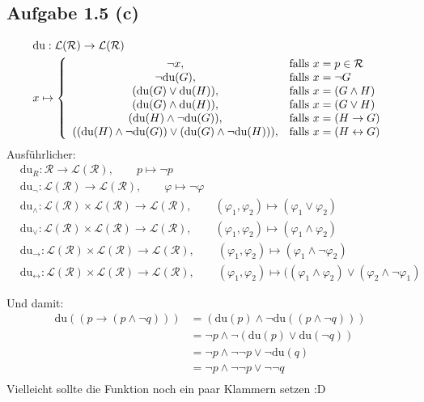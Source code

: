 \subsection*{Aufgabe 1.5 (c)}
\begin{align*}
	&\text{du}:\mathcal{L}(\mathcal{R})\to\mathcal{L}(\mathcal{R})\\
	&x\mapsto \left\lbrace\begin{array}{cl}
		\neg x, & \text{falls } x=p\in\mathcal{R}\\
		\neg\text{du}(G), & \text{falls } x=\neg G\\
		(\text{du}(G)\vee\text{du}(H)), & \text{falls } x=(G\wedge H)\\
		(\text{du}(G)\wedge\text{du}(H)), & \text{falls } x=(G\vee H)\\
		(\text{du}(H)\wedge\neg\text{du}(G)), & \text{falls } x=(H\to G)\\
		((\text{du}(H)\wedge\neg \text{du}(G))\vee(\text{du}(G)\wedge\neg\text{du}(H))), & \text{falls } x=(H\leftrightarrow G)\\
	\end{array}\right.
\end{align*}
Ausführlicher:
\begin{align*}
	&\text{du}_R:\mathcal{R}\to\mathcal{L}(\mathcal{R}),\qquad p\mapsto\neg p\\
	&\text{du}_{\neg}:\mathcal{L}(\mathcal{R})\to\mathcal{L}(\mathcal{R}),\qquad\varphi\mapsto\neg\varphi\\
	&\text{du}_{\wedge}:\mathcal{L}(\mathcal{R})\times\mathcal{L}(\mathcal{R})\to\mathcal{L}(\mathcal{R}),\qquad(\varphi_1,\varphi_2)\mapsto(\varphi_1\vee\varphi_2)\\
	&\text{du}_{\vee}:\mathcal{L}(\mathcal{R})\times\mathcal{L}(\mathcal{R})\to\mathcal{L}(\mathcal{R}),\qquad(\varphi_1,\varphi_2)\mapsto(\varphi_1\wedge\varphi_2)\\
	&\text{du}_{\to}:\mathcal{L}(\mathcal{R})\times\mathcal{L}(\mathcal{R})\to\mathcal{L}(\mathcal{R}),\qquad(\varphi_1,\varphi_2)\mapsto(\varphi_1\wedge\neg\varphi_2)\\
	&\text{du}_{\leftrightarrow}:\mathcal{L}(\mathcal{R})\times\mathcal{L}(\mathcal{R})\to\mathcal{L}(\mathcal{R}),\qquad(\varphi_1,\varphi_2)\mapsto((\varphi_1\wedge\varphi_2)\vee(\varphi_2\wedge\neg\varphi_1)
\end{align*}

Und damit:
\begin{align*}
	\text{du}((p\to(p\wedge\neg q)))
	&=(\text{du}(p)\wedge\neg\text{du}((p\wedge\neg q)))\\
	&=\neg p\wedge\neg(\text{du}(p)\vee\text{du}(\neg q))\\
	&=\neg p\wedge\neg\neg p\vee\neg\text{du}(q)\\
	&=\neg p\wedge\neg\neg p\vee\neg\neg q\\
\end{align*}
Vielleicht sollte die Funktion noch ein paar Klammern setzen :D
